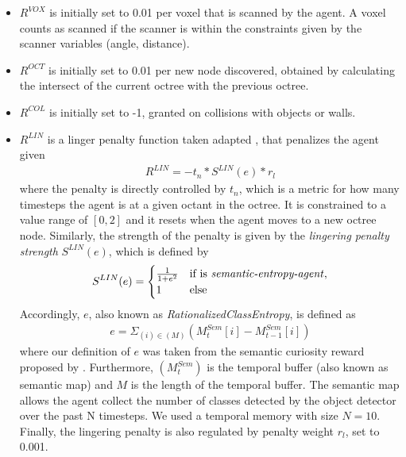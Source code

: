 \begin{itemize}
    \item $R^{VOX}$ is initially set to 0.01 per voxel that is scanned by the agent. A voxel counts as scanned if the scanner is within the constraints given by the scanner variables (angle, distance).
    \item $R^{OCT}$ is initially set to 0.01 per new node discovered, obtained by calculating the intersect of the current octree with the previous octree.
    \item $R^{COL}$ is initially set to -1, granted on collisions with objects or walls.
    \item $R^{LIN}$ is a linger penalty function taken adapted \cite{github-mbaske-explorer-drone}, that penalizes the agent given 
        \begin{gather}
        R^{LIN} = -t_n  * S^{LIN}(e) * r_l
        \label{eu_penalty_linger}
        \end{gather}
    where the penalty is directly controlled by $t_n$, which is a metric for how many timesteps the agent is at a given octant in the octree. It is constrained to a value range of $[0,2]$ and it resets when the agent moves to a new octree node. 
    Similarly, the strength of the penalty is given by the \textit{lingering penalty strength} $S^{LIN}(e)$, which is defined by
     \begin{gather}
        S^{LIN}(e) =
        \begin{cases}
            \frac{1}{1 + e^2} & \text{if is \textit{semantic-entropy-agent}}, \\
            1 & \text{else}
        \end{cases}
        \label{eu_lingeringpenaltystrength} 
    \end{gather}
    Accordingly, $e$, also known as \textit{RationalizedClassEntropy}, is defined as
    \begin{gather}
    e = \Sigma_{(i) \in(M)}\left(M_{t}^{S e m}[i]-M_{t-1}^{S e m}[i]\right) 
    \label{eu_rationalized_class_entropy}
    \end{gather}
    where our definition of $e$ was taken from the semantic curiosity reward proposed by \cite{chaplot2020semantic}. Furthermore, $\left(M_{t}^{S e m}\right)$ is the temporal buffer (also known as semantic map) and $M$ is the length of the temporal buffer. The semantic map allows the agent collect the number of classes detected by the object detector over the past N timesteps. We used a temporal memory with size $N = 10$. 
    Finally, the lingering penalty is also regulated by penalty weight $r_l$, set to 0.001. 
    

\end{itemize}
